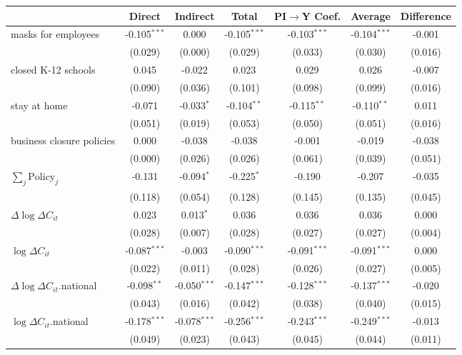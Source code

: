 
\begin{tabular}{lccccc|>{}c}
\toprule
  & Direct & Indirect & Total & PI$\to$Y Coef. & Average & Difference\\
\midrule
masks for employees & -0.105$^{***}$ & 0.000 & -0.105$^{***}$ & -0.103$^{***}$ & -0.104$^{***}$ & -0.001\\
 & (0.029) & (0.000) & (0.029) & (0.033) & (0.030) & (0.016)\\
closed K-12 schools & 0.045 & -0.022 & 0.023 & 0.029 & 0.026 & -0.007\\
 & (0.090) & (0.036) & (0.101) & (0.098) & (0.099) & (0.016)\\
stay at home & -0.071 & -0.033$^{*}$ & -0.104$^{**}$ & -0.115$^{**}$ & -0.110$^{**}$ & 0.011\\
 & (0.051) & (0.019) & (0.053) & (0.050) & (0.051) & (0.016)\\
business closure policies & 0.000 & -0.038 & -0.038 & -0.001 & -0.019 & -0.038\\
 & (0.000) & (0.026) & (0.026) & (0.061) & (0.039) & (0.051)\\
$\sum_j \mathrm{Policy}_j$ & -0.131 & -0.094$^{*}$ & -0.225$^{*}$ & -0.190 & -0.207 & -0.035\\
 & (0.118) & (0.054) & (0.128) & (0.145) & (0.135) & (0.045)\\
$\Delta \log \Delta C_{it}$ & 0.023 & 0.013$^{*}$ & 0.036 & 0.036 & 0.036 & 0.000\\
 & (0.028) & (0.007) & (0.028) & (0.027) & (0.027) & (0.004)\\
$\log \Delta C_{it}$ & -0.087$^{***}$ & -0.003 & -0.090$^{***}$ & -0.091$^{***}$ & -0.091$^{***}$ & 0.000\\
 & (0.022) & (0.011) & (0.028) & (0.026) & (0.027) & (0.005)\\
$\Delta \log \Delta C_{it}$.national & -0.098$^{**}$ & -0.050$^{***}$ & -0.147$^{***}$ & -0.128$^{***}$ & -0.137$^{***}$ & -0.020\\
 & (0.043) & (0.016) & (0.042) & (0.038) & (0.040) & (0.015)\\
$\log \Delta C_{it}$.national & -0.178$^{***}$ & -0.078$^{***}$ & -0.256$^{***}$ & -0.243$^{***}$ & -0.249$^{***}$ & -0.013\\
 & (0.049) & (0.023) & (0.043) & (0.045) & (0.044) & (0.011)\\
\bottomrule
\end{tabular}